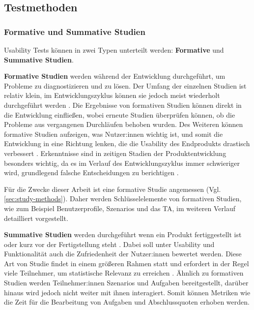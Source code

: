 \subsection{Testmethoden}
\subsubsection{Formative und Summative Studien}
\label{sec:formative-summative}
Usability Tests können in zwei Typen unterteilt werden: \textbf{Formative} und \textbf{Summative
  Studien}.

\vspace{\baselineskip}

\textbf{Formative Studien} werden während der Entwicklung durchgeführt, um Probleme zu diagnostizieren und zu lösen. Der Umfang der einzelnen Studien ist relativ klein, im Entwicklungszyklus können sie jedoch meist wiederholt durchgeführt werden \parencite{barnumUsabilityTesting2021}. Die Ergebnisse von formativen Studien können direkt in die Entwicklung einfließen, wobei erneute Studien überprüfen können, ob die Probleme aus vergangenen Durchläufen behoben wurden. Des Weiteren können formative Studien aufzeigen, was Nutzer:innen wichtig ist, und somit die Entwicklung in eine Richtung lenken, die die Usability des Endprodukts drastisch verbessert \parencite{barnumUsabilityTesting2021}. Erkenntnisse sind in zeitigen Stadien der Produktentwicklung besonders wichtig, da es im Verlauf des Entwicklungszyklus immer schwieriger wird, grundlegend falsche Entscheidungen zu berichtigen \parencite{barnumUsabilityTesting2021}.

Für die Zwecke dieser Arbeit ist eine formative Studie angemessen (Vgl. \ref{sec:study-methods}). Daher werden Schlüsselelemente von formativen Studien, wie zum Beispiel Benutzerprofile, Szenarios und das \acl{TA}, im weiteren Verlauf detailliert vorgestellt.

\vspace{\baselineskip}

\textbf{Summative Studien} werden durchgeführt wenn ein Produkt fertiggestellt ist oder kurz vor der Fertigstellung steht \parencite{barnumUsabilityTesting2021}. Dabei soll unter Usability und Funktionalität auch die Zufriedenheit der Nutzer:innen bewertet werden. Diese Art von Studie findet in einem größeren Rahmen statt und erfordert in der Regel viele Teilnehmer, um statistische Relevanz zu erreichen \parencite{barnumUsabilityTesting2021}. Ähnlich zu formativen Studien werden Teilnehmer:innen Szenarios und Aufgaben bereitgestellt, darüber hinaus wird jedoch nicht weiter mit ihnen interagiert. Somit können Metriken wie die Zeit für die Bearbeitung von Aufgaben und Abschlussquoten erhoben werden.


